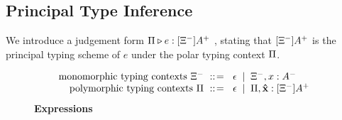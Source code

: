 \subsection{Principal Type Inference}

We introduce a judgement form $\ctxp \triangleright e : [\ctxm^-]A^+$ , stating that $[\ctxm^-]A^+$  is the principal typing scheme of $e$ under the polar typing context $\ctxp$. 

\begin{figure}[!htb]
\begin{center}
\begin{framed}
\begin{minipage}[t]{0.95\columnwidth}
\[\begin{array}{r@{~}c@{~}l}
    \text{monomorphic typing contexts}~\ctxm^- & \bnfis {} & \epsilon \bnfor \ctxm^-, x : A^-\\
    \text{polymorphic typing contexts}~\ctxp & \bnfis {} & \epsilon \bnfor \ctxp, \letvar : [\ctxm^-]A^+\\
    \end{array}\]
    \textbf{Expressions}
    \begin{mathpar}
    
    
    
    
    

\end{mathpar}
\end{minipage}
\end{framed}
\end{center}
\end{figure}
